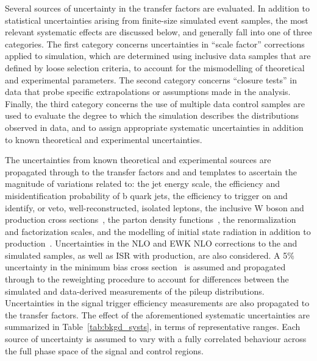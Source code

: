Several sources of uncertainty in the transfer factors are evaluated.
In addition to statistical uncertainties arising from finite-size
simulated event samples, the most relevant systematic effects are
discussed below, and generally fall into one of three categories. The
first category concerns uncertainties in ``scale factor'' corrections
applied to simulation, which are determined using inclusive data
samples that are defined by loose selection criteria, to account for
the mismodelling of theoretical and experimental parameters. The
second category concerns ``closure tests'' in data that probe specific
extrapolations or assumptions made in the analysis. Finally, the third
category concerns the use of multiple data control samples are used to
evaluate the degree to which the simulation describes the \mht
distributions observed in data, and to assign appropriate systematic
uncertainties in addition to known theoretical and experimental
uncertainties.

The uncertainties from known theoretical and experimental sources are
propagated through to the transfer factors and \mht and \nb templates
to ascertain the magnitude of variations related to: the jet energy
scale, the efficiency and misidentification probability of b quark
jets, the efficiency to trigger on and identify, or veto,
well-reconstructed, isolated leptons, the inclusive W boson and \ttbar
production cross sections~\cite{}, the parton density
functions~\cite{}, the renormalization and factorization scales, and
the modelling of initial state radiation in addition to \ttbar
production~\cite{}. Uncertainties in the NLO and EWK NLO corrections
to the \wj and \zj simulated samples, as well as ISR with \ttbar
production, are also considered. A 5\% uncertainty in the minimum bias
cross section~\cite{} is assumed and propagated through to the
reweighting procedure to account for differences between the simulated
and data-derived measurements of the pileup
distributions. Uncertainties in the signal trigger efficiency
measurements are also propagated to the transfer factors. The effect
of the aforementioned systematic uncertainties are summarized in
Table~\ref{tab:bkgd_systs}, in terms of representative ranges.  Each
source of uncertainty is assumed to vary with a fully correlated
behaviour across the full phase space of the signal and control
regions.

